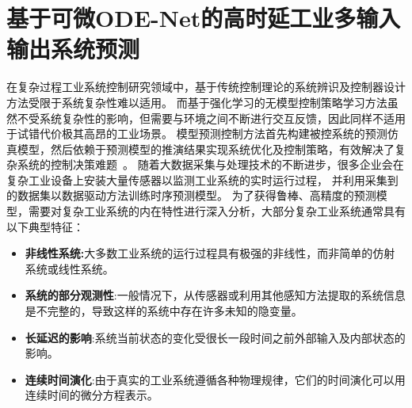 \renewcommand{\b}{\boldsymbol}

\chapter{基于可微ODE-Net的高时延工业多输入输出系统预测}
在复杂过程工业系统控制研究领域中，基于传统控制理论的系统辨识及控制器设计方法受限于系统复杂性难以适用。
而基于强化学习的无模型控制策略学习方法虽然不受系统复杂性的影响，但需要与环境之间不断进行交互反馈，因此同样不适用于试错代价极其高昂的工业场景。
模型预测控制方法首先构建被控系统的预测仿真模型，然后依赖于预测模型的推演结果实现系统优化及控制策略，有效解决了复杂系统的控制决策难题~\cite{Yuan2020,Member2019,wu2020optimization}。
随着大数据采集与处理技术的不断进步，很多企业会在复杂工业设备上安装大量传感器以监测工业系统的实时运行过程，
并利用采集到的数据集以数据驱动方法训练时序预测模型\cite{larsson2002identification}。
为了获得鲁棒、高精度的预测模型，需要对复杂工业系统的内在特性进行深入分析，大部分复杂工业系统通常具有以下典型特征：
\begin{itemize}
\item \textbf{非线性系统:}大多数工业系统的运行过程具有极强的非线性，而非简单的仿射系统或线性系统。
\item \textbf{系统的部分观测性}:一般情况下，从传感器或利用其他感知方法提取的系统信息是不完整的，导致这样的系统中存在许多未知的隐变量。
\item \textbf{长延迟的影响}:系统当前状态的变化受很长一段时间之前外部输入及内部状态的影响。
\item \textbf{连续时间演化}:由于真实的工业系统遵循各种物理规律，它们的时间演化可以用连续时间的微分方程表示。
\end{itemize}

